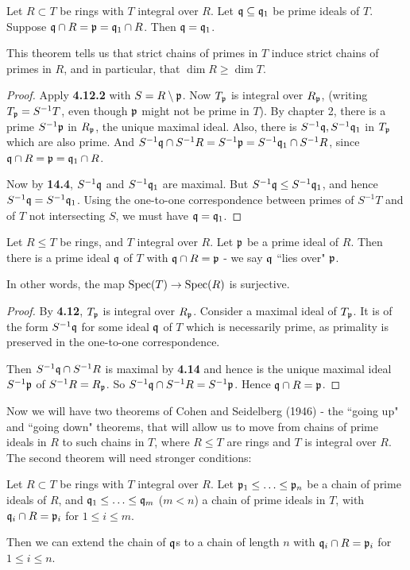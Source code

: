 \documentclass[10pt,a4paper]{article}
\begin{document}
\begin{theorem}
  Let $R \subset T$ be rings with $T$ integral over $R$. Let $\mathfrak{q} \subseteq \mathfrak{q}_1$ be prime ideals of $T$. Suppose $\mathfrak{q}\cap R = \mathfrak{p} = \mathfrak{q}_1 \cap R$. Then $\mathfrak{q}=\mathfrak{q}_1$.
\end{theorem}
This theorem tells us that strict chains of primes in $T$ induce strict chains of primes in $R$, and in particular, that $\dim R \geq \dim T$.
\begin{proof}
  Apply \textbf{4.12.2} with $S = R \setminus \mathfrak{p}$. Now $T_{\mathfrak{p}}$ is integral over $R_{\mathfrak{p}}$, (writing $T_{\mathfrak{p}} = S^{-1}T$, even though $\mathfrak{p}$ might not be prime in $T$). By chapter 2, there is a prime $S^{-1}\mathfrak{p}$ in $R_{\mathfrak{p}}$, the unique maximal ideal. Also, there is $S^{-1}\mathfrak{q}, S^{-1}\mathfrak{q}_1$ in $T_{\mathfrak{p}}$ which are also prime. And $S^{-1}\mathfrak{q}\cap S^{-1}R = S^{-1}\mathfrak{p} = S^{-1}\mathfrak{q}_1\cap S^{-1}R$, since $\mathfrak{q}\cap R =\mathfrak{p} = \mathfrak{q}_1 \cap R$.

  Now by \textbf{14.4}, $S^{-1}\mathfrak{q}$ and $S^{-1}\mathfrak{q}_1$ are maximal. But $S^{-1}\mathfrak{q} \leq S^{-1}\mathfrak{q}_1$, and hence $S^{-1}\mathfrak{q}= S^{-1}\mathfrak{q}_1$. Using the one-to-one correspondence between primes of $S^{-1}T$ and of $T$ not intersecting $S$, we must have $\mathfrak{q}=\mathfrak{q}_1$.
\end{proof}
\begin{theorem}
  Let $R \leq T$ be rings, and $T$ integral over $R$. Let $\mathfrak{p}$ be a prime ideal of $R$. Then there is a prime ideal $\mathfrak{q}$ of $T$ with $\mathfrak{q} \cap R =\mathfrak{p}$ - we say $\mathfrak{q}$ ``lies over" $\mathfrak{p}$.

  In other words, the map $\operatorname{Spec}(T) \to \operatorname{Spec}(R)$ is surjective.
\end{theorem}
\begin{proof}
  By \textbf{4.12}, $T_{\mathfrak{p}}$ is integral over $R_{\mathfrak{p}}$. Consider a maximal ideal of $T_{\mathfrak{p}}$. It is of the form $S^{-1}\mathfrak{q}$ for some ideal $\mathfrak{q}$ of $T$ which is necessarily prime, as primality is preserved in the one-to-one correspondence.

  Then $S^{-1}\mathfrak{q} \cap S^{-1}R$ is maximal by \textbf{4.14} and hence is the unique maximal ideal $S^{-1}\mathfrak{p}$ of $S^{-1}R = R_{\mathfrak{p}}$. So $S^{-1}\mathfrak{q}\cap S^{-1}R = S^{-1}\mathfrak{p}$. Hence $\mathfrak{q}\cap R = \mathfrak{p}$.
\end{proof}
Now we will have two theorems of Cohen and Seidelberg (1946) - the ``going up" and ``going down" theorems, that will allow us to move from chains of prime ideals in $R$ to such chains in $T$, where $R\leq T$ are rings and $T$ is integral over $R$. The second theorem will need stronger conditions:
\begin{theorem}
  Let $R \subset T$ be rings with $T$ integral over $R$. Let $\mathfrak{p}_1 \leq \ldots \leq \mathfrak{p}_n$ be a chain of prime ideals of $R$, and $\mathfrak{q}_1 \leq \ldots \leq \mathfrak{q}_m$ ($m<n$) a chain of prime ideals in $T$, with $\mathfrak{q}_i \cap R = \mathfrak{p}_i$ for $1\leq i \leq m$.

  Then we can extend the chain of $\mathfrak{q}$s to a chain of length $n$ with $\mathfrak{q}_i \cap R = \mathfrak{p}_i$ for $1 \leq i \leq n$.
\end{theorem}
\end{document}
